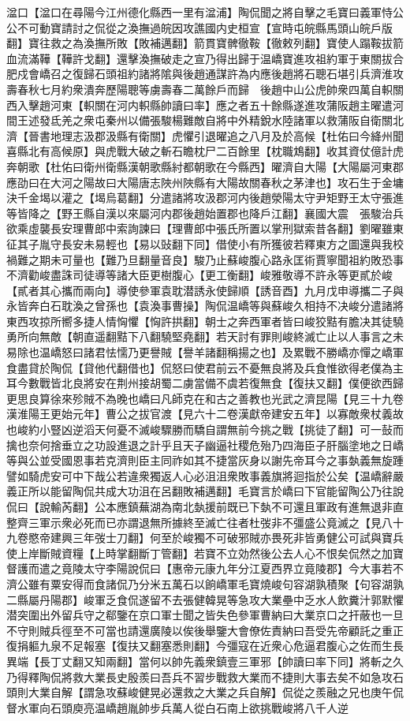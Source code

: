 湓口【湓口在尋陽今江州德化縣西一里有湓浦】陶侃聞之將自擊之毛寶曰義軍恃公公不可動寶請討之侃從之渙撫過皖因攻譙國内史桓宣【宣時屯皖縣馬頭山皖戶版翻】寶往救之為渙撫所敗【敗補邁翻】箭貫寶髀徹鞍【徹敕列翻】寶使人蹋鞍拔箭血流滿鞾【鞾許戈翻】還擊渙撫破走之宣乃得出歸于温嶠寶進攻祖約軍于東關拔合肥戍會嶠召之復歸石頭祖約諸將隂與後趙通謀許為内應後趙將石聰石堪引兵濟淮攻壽春秋七月約衆潰奔歷陽聰等虜壽春二萬餘戶而歸　後趙中山公虎帥衆四萬自軹關西入擊趙河東【軹關在河内軹縣帥讀曰率】應之者五十餘縣遂進攻蒲阪趙主曜遣河間王述發氐羌之衆屯秦州以備張駿楊難敵自將中外精銳水陸諸軍以救蒲阪自衛關北濟【晉書地理志汲郡汲縣有衛關】虎懼引退曜追之八月及於高候【杜佑曰今絳州聞喜縣北有高候原】與虎戰大破之斬石瞻枕尸二百餘里【枕職鴆翻】收其資仗億計虎奔朝歌【杜佑曰衛州衛縣漢朝歌縣紂都朝歌在今縣西】曜濟自大陽【大陽屬河東郡應劭曰在大河之陽故曰大陽唐志陜州陜縣有大陽故關春秋之茅津也】攻石生于金墉決千金堨以灌之【堨烏葛翻】分遣諸將攻汲郡河内後趙滎陽太守尹矩野王太守張進等皆降之【野王縣自漢以來屬河内郡後趙始置郡也降戶江翻】襄國大震　張駿治兵欲乘虛襲長安理曹郎中索詢諫曰【理曹郎中張氏所置以掌刑獄索昔各翻】劉曜雖東征其子胤守長安未易輕也【易以䜴翻下同】借使小有所獲彼若釋東方之圖還與我校禍難之期未可量也【難乃旦翻量音良】駿乃止蘇峻腹心路永匡術賈寧聞祖約敗恐事不濟勸峻盡誅司徒導等諸大臣更樹腹心【更工衡翻】峻雅敬導不許永等更貳於峻【貳者其心攜而兩向】導使參軍袁耽潜誘永使歸順【誘音酉】九月戊申導攜二子與永皆奔白石耽渙之曾孫也【袁渙事曹操】陶侃温嶠等與蘇峻久相持不决峻分遣諸將東西攻掠所嚮多捷人情恟懼【恟許拱翻】朝士之奔西軍者皆曰峻狡黠有膽决其徒驍勇所向無敵【朝直遥翻黠下八翻驍堅堯翻】若天討有罪則峻終滅亡止以人事言之未易除也温嶠怒曰諸君怯懦乃更譽賊【譽羊諸翻稱揚之也】及累戰不勝嶠亦憚之嶠軍食盡貸於陶侃【貸他代翻借也】侃怒曰使君前云不憂無良將及兵食惟欲得老僕為主耳今數戰皆北良將安在荆州接胡蜀二虜當備不虞若復無食【復扶又翻】僕便欲西歸更思良算徐來殄賊不為晚也嶠曰凡師克在和古之善教也光武之濟昆陽【見三十九卷漢淮陽王更始元年】曹公之拔官渡【見六十二卷漢獻帝建安五年】以寡敵衆杖義故也峻約小豎凶逆滔天何憂不滅峻驟勝而驕自謂無前今挑之戰【挑徒了翻】可一鼔而擒也奈何捨垂立之功設進退之計乎且天子幽逼社稷危殆乃四海臣子肝腦塗地之日嶠等與公並受國恩事若克濟則臣主同祚如其不捷當灰身以謝先帝耳今之事埶義無旋踵譬如騎虎安可中下哉公若違衆獨返人心必沮沮衆敗事義旗將迴指於公矣【温嶠辭嚴義正所以能留陶侃共成大功沮在呂翻敗補邁翻】毛寶言於嶠曰下官能留陶公乃往說侃曰【說輸芮翻】公本應鎮蕪湖為南北埶援前既已下埶不可還且軍政有進無退非直整齊三軍示衆必死而已亦謂退無所據終至滅亡往者杜弢非不彊盛公竟滅之【見八十九卷愍帝建興三年弢士刀翻】何至於峻獨不可破邪賊亦畏死非皆勇健公可試與寶兵使上岸斷賊資糧【上時掌翻斷丁管翻】若寶不立効然後公去人心不恨矣侃然之加寶督護而遣之竟陵太守李陽說侃曰【惠帝元康九年分江夏西界立竟陵郡】今大事若不濟公雖有粟安得而食諸侃乃分米五萬石以餉嶠軍毛寶燒峻句容湖孰積聚【句容湖孰二縣屬丹陽郡】峻軍乏食侃遂留不去張健韓晃等急攻大業壘中乏水人飲糞汁郭默懼潜突圍出外留兵守之郗鑒在京口軍士聞之皆失色參軍曹納曰大業京口之扞蔽也一旦不守則賊兵徑至不可當也請還廣陵以俟後舉鑒大會僚佐責納曰吾受先帝顧託之重正復捐軀九泉不足報塞【復扶又翻塞悉則翻】今彊寇在近衆心危逼君腹心之佐而生長異端【長丁丈翻又知兩翻】當何以帥先義衆鎮壹三軍邪【帥讀曰率下同】將斬之久乃得釋陶侃將救大業長史殷羨曰吾兵不習步戰救大業而不捷則大事去矣不如急攻石頭則大業自解【謂急攻蘇峻健晃必還救之大業之兵自解】侃從之羨融之兄也庚午侃督水軍向石頭庾亮温嶠趙胤帥步兵萬人從白石南上欲挑戰峻將八千人逆